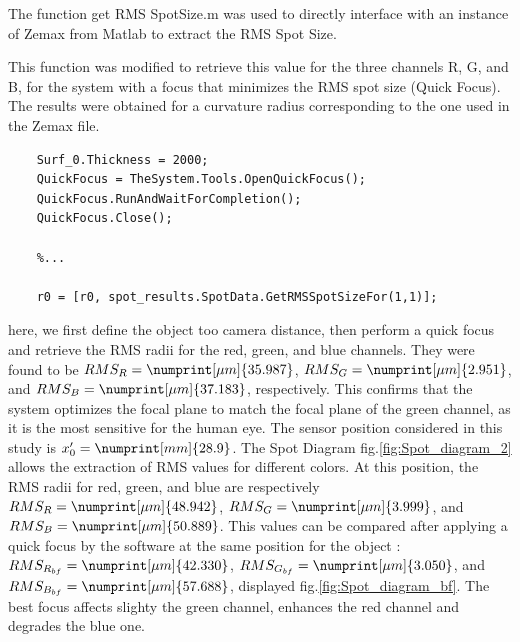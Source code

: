 \documentclass[10pt,letterpaper]{article}
\begin{document}
The function get \textunderscore RMS \textunderscore SpotSize.m was used to directly interface with an instance of Zemax from Matlab to extract the RMS Spot Size. 

This function was modified to retrieve this value for the three channels R, G, and B, for the system with a focus that minimizes the RMS spot size (Quick Focus). The results were obtained for a curvature radius corresponding to the one used in the Zemax file.

\begin{verbatim}
    Surf_0.Thickness = 2000;
    QuickFocus = TheSystem.Tools.OpenQuickFocus();
    QuickFocus.RunAndWaitForCompletion();
    QuickFocus.Close();

    %...

    r0 = [r0, spot_results.SpotData.GetRMSSpotSizeFor(1,1)];
\end{verbatim}

here, we first define the object too camera distance, then perform a quick focus and retrieve the RMS radii for the red, green, and blue channels. They were found to be $RMS_R = \numprint[\mu m]{35.987}$, $RMS_G = \numprint[\mu m]{2.951}$, and $RMS_B = \numprint[\mu m]{37.183}$, respectively. This confirms that the system optimizes the focal plane to match the focal plane of the green channel, as it is the most sensitive for the human eye.
The sensor position considered in this study is $x'_0 = \numprint[mm]{28.9}$. The Spot Diagram fig.\ref{fig:Spot_diagram_2} allows the extraction of RMS values for different colors. At this position, the RMS radii for red, green, and blue are respectively $RMS_R = \numprint[\mu m]{48.942}$, $RMS_G = \numprint[\mu m]{3.999}$, and $RMS_B = \numprint[\mu m]{50.889}$. This values can be compared after applying a quick focus by the software at the same position for the object : $RMS_{R_{bf}} = \numprint[\mu m]{42.330}$, $RMS_{G_{bf}} = \numprint[\mu m]{3.050}$, and $RMS_{B_{bf}} = \numprint[\mu m]{57.688}$, displayed fig.\ref{fig:Spot_diagram_bf}. The best focus affects slighty the green channel, enhances the red channel and degrades the blue one.
\end{document}
